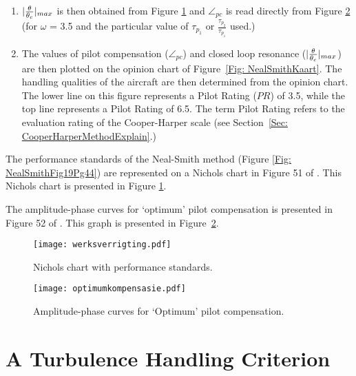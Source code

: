 \documentclass{report}
\begin{document}
\begin{enumerate}
	\item{$\arrowvert \frac{\theta}{\theta_c} \arrowvert _{max}$ is then obtained from Figure \ref{Fig: werksverrigting} and $\angle_{pc}$ is read directly from Figure \ref{Fig: optimumkompensasie} (for $\omega$ =  3.5 and the particular value of $\tau_{p_1}$ or $\frac{\tau_{p_2}}{\tau_{p_1}}$ used.)}
	\item{The values of pilot compensation ($\angle_{pc}$) and closed loop resonance ($\arrowvert \frac{\theta}{\theta_c} \arrowvert _{max}$) are then plotted on the opinion chart of \mbox{Figure \ref{Fig: NealSmithKaart}}.  The handling qualities of the aircraft are then determined from the opinion chart.  The lower line on this figure represents a Pilot Rating ($PR$) of 3.5, while the top line represents a Pilot Rating of 6.5.  The term Pilot Rating refers to the evaluation rating of the Cooper-Harper scale (see \mbox{Section \ref{Sec:  CooperHarperMethodExplain}}.)}
\end{enumerate}

The performance standards of the Neal-Smith method (Figure \ref{Fig: NealSmithFig19Pg44}) are represented on a Nichols chart in Figure 51 of \cite{NealSmith}.  This Nichols chart is presented in Figure \ref{Fig: werksverrigting}.

The amplitude-phase curves for `optimum' pilot compensation is presented in Figure 52 of \cite{NealSmith}.  This graph is presented in \mbox{Figure \ref{Fig: optimumkompensasie}}.

\begin{figure}[htb]
	\begin{center}
		\texttt{[image: werksverrigting.pdf]}
	\end{center}
	\caption{Nichols chart with performance standards.}
	\label{Fig: werksverrigting}
\end{figure}

\begin{figure}[htb]
	\begin{center}
		\texttt{[image: optimumkompensasie.pdf]}
	\end{center}
	\caption{Amplitude-phase curves for `Optimum' pilot compensation.  }
	\label{Fig: optimumkompensasie}
\end{figure}

\clearpage

\section{A Turbulence Handling Criterion}
\end{document}
